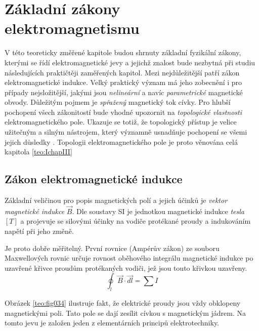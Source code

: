\setchaptertoc
\chapter{Základní zákony elektromagnetismu}\label{teo:IchapII}
  V této teoreticky změřené kapitole budou shrnuty základní fyzikální zákony, kterými se řídí
  elektromagnetické jevy a jejichž znalost bude nezbytná při studiu následujících praktičtěji
  zaměřených kapitol. Mezi nejdůležitější patří zákon elektromagnetické indukce. Velký praktický
  význam má jeho zobecnění i pro případy nejsložitější, jakými jsou \emph{nelineární} a navíc
  \emph{parametrické} magnetické obvody. Důležitým pojmem je \emph{spřažený} magnetický tok cívky.
  Pro hlubší pochopení všech zákonitostí bude vhodné upozornit na \emph{topologické vlastnosti}
  elektromagnetického pole. Ukazuje se totiž, že topologický přístup je velice užitečným a silným
  nástrojem, který významně usnadňuje pochopení \wikiMaxwellEq se všemi jejich důsledky
  \cite[s.~6]{Patocka4}. Topologii elektromagnetického pole je proto věnována celá kapitola
  \ref{teo:IchapIII}
  
  \section{Zákon elektromagnetické indukce}\label{teo:IchapIIsecI}
    Základní veličinou pro popis magnetických polí a jejich účinků je \emph{vektor magnetické
    indukce} \(\vec{B}\). Dle soustavy SI je jednotkou magnetické indukce \emph{tesla} \([T]\) a
    projevuje se silovými účinky na vodiče protékané proudy a indukováním napětí při jeho změně.

    Je proto dobře měřitelný. První rovnice (Ampérův zákon) ze souboru Maxwellových rovnic určuje
    rovnost oběhového integrálu magnetické indukce po uzavřené křivce proudům protékaných vodiči,
    jež jsou touto křivkou uzavřeny.
    \begin{equation}\label{es:eq_amp_law}
      \oint_l \vec{B} \cdot \vec{dl} = \sum I
    \end{equation}
    

    Obrázek \ref{teo:fig034} ilustruje fakt, že elektrické proudy jsou vždy obklopeny 
    magnetickými poli. Tato pole se dají zesílit cívkou s magnetickým jádrem. Na tomto jevu je 
    založen jeden z elementárních principů elektrotechniky.    
       
